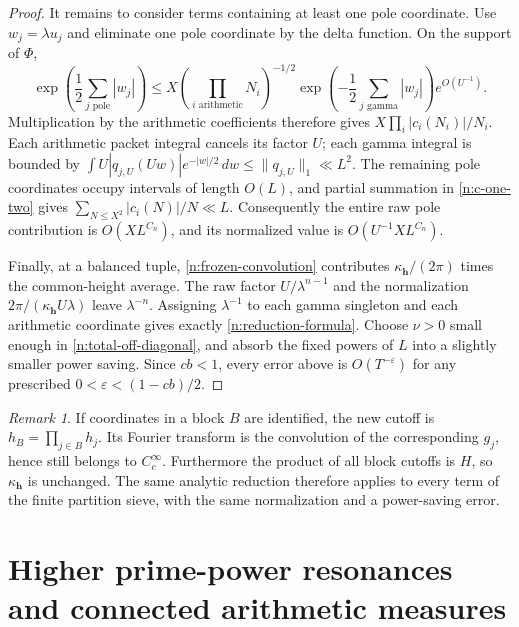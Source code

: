 \documentclass[11pt]{article}
\numberwithin{equation}{section}
\theoremstyle{remark}
\newtheorem{remark}[theorem]{Remark}
\begin{document}
\begin{proof}
It remains to consider terms containing at least one pole coordinate.
Use $w_j=\lambda u_j$ and eliminate one pole coordinate by the delta
function. On the support of $\Phi$,
\[
 \exp\left(\frac12\sum_{j\text{ pole}}|w_j|\right)
 \le X\left(\prod_{i\text{ arithmetic}}N_i\right)^{-1/2}
       \exp\left(-\frac12\sum_{j\text{ gamma}}|w_j|\right)
       e^{O(U^{-1})}.
\]
Multiplication by the arithmetic coefficients therefore gives
$X\prod_i|c_i(N_i)|/N_i$. Each arithmetic packet integral cancels its
factor $U$; each gamma integral is bounded by
$\int U|q_{j,U}(Uw)|e^{-|w|/2}\,dw\le\|q_{j,U}\|_1\ll L^2$.
The remaining pole coordinates occupy intervals of length $O(L)$,
and partial summation in \eqref{n:c-one-two} gives
$\sum_{N\le X^2}|c_i(N)|/N\ll L$. Consequently the entire raw pole
contribution is $O(XL^{C_n})$, and its normalized value is
$O(U^{-1}XL^{C_n})$.

Finally, at a balanced tuple, \eqref{n:frozen-convolution} contributes
$\kappa_{\boldsymbol h}/(2\pi)$ times the common-height average.
The raw factor $U/\lambda^{n-1}$ and the normalization
$2\pi/(\kappa_{\boldsymbol h}U\lambda)$ leave $\lambda^{-n}$.
Assigning $\lambda^{-1}$ to each gamma singleton and each arithmetic
coordinate gives exactly \eqref{n:reduction-formula}. Choose $\nu>0$
small enough in \eqref{n:total-off-diagonal}, and absorb the fixed
powers of $L$ into a slightly smaller power saving. Since $cb<1$,
every error above is $O(T^{-\varepsilon})$ for any prescribed
$0<\varepsilon<(1-cb)/2$.
\end{proof}

\begin{remark}\label{n:cutoff-closure}
If coordinates in a block $B$ are identified, the new cutoff is
$h_B=\prod_{j\in B}h_j$. Its Fourier transform is the convolution of
the corresponding $g_j$, hence still belongs to $C_c^\infty$.
Furthermore the product of all block cutoffs is $H$, so
$\kappa_{\boldsymbol h}$ is unchanged. The same analytic reduction
therefore applies to every term of the finite partition sieve, with
the same normalization and a power-saving error.
\end{remark}


\section{Higher prime-power resonances and connected arithmetic measures}
\end{document}
